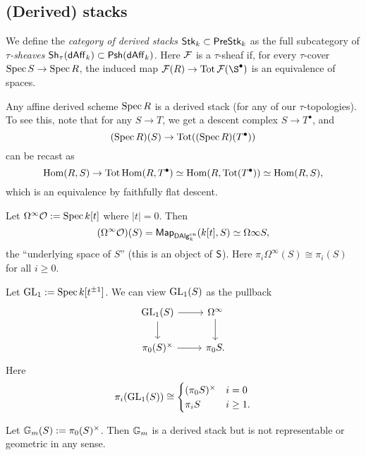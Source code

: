 \documentclass{amsart}
\begin{document}
\subsection{(Derived) stacks}

\begin{dfn}
	We define the \emph{category of derived stacks} $\mathsf{Stk}_k \subset \mathsf{PreStk}_k$ as the full subcategory of \emph{$\tau$-sheaves} $\mathsf{Sh}_\tau(\mathsf{dAff}_k) \subset \mathsf{Psh}(\mathsf{dAff}_k)$.
	Here $\mathcal{F}$ is a $\tau$-sheaf if, for every $\tau$-cover $\operatorname{Spec} S \to \operatorname{Spec} R$, the induced map $\Fc(R) \to \Tot \Fc(\S^\bullet)$ is an equivalence of spaces.
\end{dfn}

\begin{ex}
	Any affine derived scheme $\operatorname{Spec} R$ is a derived stack (for any of our $\tau$-topologies).
	To see this, note that for any $S \to T$, we get a descent complex $S \to T^\bullet$, and 
	\[
		(\operatorname{Spec} R)(S) \to \operatorname{Tot}((\operatorname{Spec} R)(T^\bullet))
	\]
	can be recast as
	\[
		\operatorname{Hom}(R, S) \to \operatorname{Tot} \operatorname{Hom}(R, T^\bullet) \simeq \operatorname{Hom}(R, \operatorname{Tot}(T^\bullet)) \simeq \operatorname{Hom}(R, S),
	\]
	which is an equivalence by faithfully flat descent.
\end{ex}

\begin{ex}
	Let $\Omega^\infty \mathcal{O} := \operatorname{Spec} k[t]$ where $|t| = 0$.
	Then
	\[
		(\Omega^\infty \mathcal{O})(S) = \mathsf{Map}_{\mathsf{DAlg}_k^{\mathrm{cn}}}(k[t], S) \simeq \Omega\infty S,
	\]
	the ``underlying space of $S$'' (this is an object of $\mathsf{S}$).
	Here $\pi_i \Omega^\infty(S) \cong \pi_i(S)$ for all $i \geq 0$.
\end{ex}

\begin{ex}
	Let $\operatorname{GL}_1 := \operatorname{Spec} k[t^{\pm 1}]$.
	We can view $\operatorname{GL}_1(S)$ as the pullback
	\[
		\begin{tikzcd}
			\GL_1(S) \rar \dar & \Omega^\infty \dar \\
			\pi_0(S)^\times \rar & \pi_0 S.
		\end{tikzcd}
	\]
	Here
	\[
		\pi_i(\operatorname{GL}_1(S)) \cong \begin{cases}
			(\pi_0 S)^\times & i = 0 \\
			\pi_i S & i \geq 1.
		\end{cases}
	\]
\end{ex}

\begin{ex}
	Let $\mathbb{G}_m(S) := \pi_0(S)^\times$.
	Then $\mathbb{G}_m$ is a derived stack but is not representable or geometric in any sense.
\end{ex}
\end{document}

